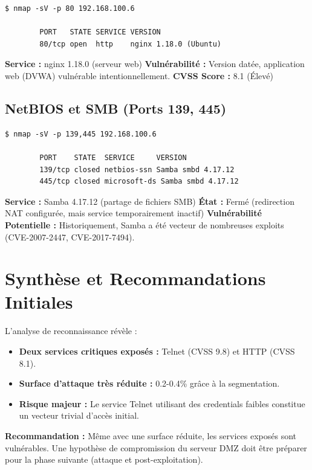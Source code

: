 \documentclass[12pt,a4paper,openany]{report}
\begin{document}
\begin{lstlisting}[caption=Detection version HTTP]
		$ nmap -sV -p 80 192.168.100.6
		
		PORT   STATE SERVICE VERSION
		80/tcp open  http    nginx 1.18.0 (Ubuntu)
	\end{lstlisting}

\textbf{Service :} nginx 1.18.0 (serveur web)
\textbf{Vulnérabilité :} Version datée, application web (DVWA) vulnérable intentionnellement.
\textbf{CVSS Score :} 8.1 (Élevé)

\subsection{NetBIOS et SMB (Ports 139, 445)}

\begin{lstlisting}[caption=Detection Samba (SMB)]
		$ nmap -sV -p 139,445 192.168.100.6
		
		PORT    STATE  SERVICE     VERSION
		139/tcp closed netbios-ssn Samba smbd 4.17.12
		445/tcp closed microsoft-ds Samba smbd 4.17.12
	\end{lstlisting}

\textbf{Service :} Samba 4.17.12 (partage de fichiers SMB)
\textbf{État :} Fermé (redirection NAT configurée, mais service temporairement inactif)
\textbf{Vulnérabilité Potentielle :} Historiquement, Samba a été vecteur de nombreuses exploits (CVE-2007-2447, CVE-2017-7494).

\section{Synthèse et Recommandations Initiales}

L'analyse de reconnaissance révèle :

\begin{itemize}[leftmargin=*]
	\item \textbf{Deux services critiques exposés :} Telnet (CVSS 9.8) et HTTP (CVSS 8.1).
	\item \textbf{Surface d'attaque très réduite :} 0.2-0.4\% grâce à la segmentation.
	\item \textbf{Risque majeur :} Le service Telnet utilisant des credentials faibles constitue un vecteur trivial d'accès initial.
\end{itemize}

\textbf{Recommandation :} Même avec une surface réduite, les services exposés sont vulnérables. Une hypothèse de compromission du serveur DMZ doit être préparer pour la phase suivante (attaque et post-exploitation).
\end{document}
